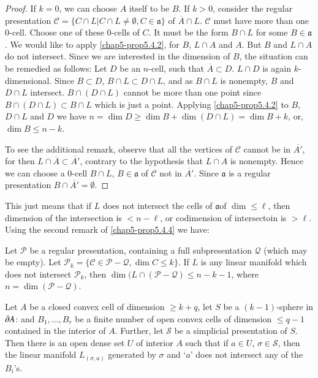 \begin{proof}
If $k=0$, we can choose $A$ itself to be $B$. If $k>0$, consider the regular presentation $\mathscr{C}=\{C\cap L|C\cap L\neq \emptyset, C\in \mathfrak{a}\}$ of $\overline{A} \cap L$. $\mathscr{C}$ must have more than one $0$-cell. Choose one of these $0$-cells of $C$. It must be the form $B\cap L$ for some $B\in \mathfrak{a}$. We would like to apply \ref{chap5-prop5.4.2}, for $B$, $L\cap A$ and $A$. But $B$ and $L\cap A$ do not intersect. Since we are interested in the dimension of $B$, the situation can be remedied as follows: Let $D$ be an $n$-cell, such that $\overline{A}\subset D$. $L\cap D$ is again $k$-dimensional. Since $B\subset D$, $B\cap L\subset D\cap L$, and as $B\cap L$ is nonempty, $B$ and $D\cap L$ intersect. $B\cap (D\cap L)$ cannot be more than one point since $B\cap (D\cap L)\subset B\cap L$ which is just a point. Applying \ref{chap5-prop5.4.2} to $B$, $D\cap L$ and $D$ we have $n=\dim D\geq \dim B+\dim (D\cap L)=\dim B+k$, or, $\dim B\leq n-k$.


To see the additional remark, observe that all the vertices of $\mathscr{C}$ cannot be in $\overline{A'}$, for then $L\cap \overline{A}\subset \overline{A'}$, contrary to the hypothesis that $L\cap A$ is nonempty. Hence we can choose a $0$-cell $B\cap L$, $B\in \mathfrak{a}$ of $\mathscr{C}$ not in $\overline{A'}$. Since $\mathfrak{a}$ is a regular presentation $B\cap \overline{A'}=\emptyset$.
\end{proof}

This just means that if $L$ does not intersect the cells of $\mathfrak{a}$\pageoriginale of $\dim \leq \ell$, then dimension of the intersection is $<n-\ell$, or codimension of intersectoin is $>\ell$. Using the second remark of \ref{chap5-prop5.4.4} we have:

\begin{corollary}\label{chap5-coro5.4.5}
Let $\mathscr{P}$ be a regular presentation, containing a full subpresentation $\mathcal{Q}$ (which may be empty). Let $\mathscr{P}_{k}=\{\mathscr{C}\in \mathscr{P}-\mathcal{Q},\dim C\leq k\}$. If $L$ is any linear manifold which does not intersect $\mathscr{P}_{k}$, then $\dim (L\cap(\mathscr{P}-\mathcal{Q})\leq n-k-1$, where $n=\dim(\mathscr{P}-\mathcal{Q})$.
\end{corollary}

\begin{proposition}\label{chap5-prop5.4.6}
Let $A$ be a closed convex cell of dimension $\geq k+q$, let $S$ be a $(k-1)$-sphere in $\partial A$: and $B_{1},\ldots,B_{r}$ be a finite number of open convex cells of dimension $\leq q-1$ contained in the interior of $A$. Further, let $\mathscr{S}$ be a simplicial presentation of $S$. Then there is an open dense set $U$ of interior $A$ such that if $a\in U$, $\sigma\in \mathscr{S}$, then the linear manifold $L_{(\sigma,a)}$ generated by $\sigma$ and `$a$' does not intersect any of the $B_{i}$'s.
\end{proposition}

